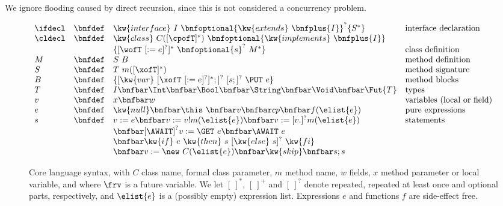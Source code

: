 \documentclass[12pt]{article}%
\begin{document}
We ignore flooding caused by direct recursion,
since this is not considered a concurrency problem.

\begin{figure}[t!]
$$
%
  \begin{array}{lrl@{\hspace{1em}}l} 
    \ifdecl & \bnfdef & 
    \kw{interface}\ I\ \bnfoptional{\kw{extends}\ \bnfplus{I}}^? 
    \{S^*\} 
    & 
    \text{interface declaration} 
    \\ 
    \cldecl & \bnfdef & \kw{class}\ C([\cpofT]^*
    )\
    \bnfoptional{\kw{implements}\ \bnfplus{I}}\ \\ & & 
  \{[\wofT  \ [:=e]^?]^*
    \
    \bnfoptional{
    s
    }^?\
    M^*
\}&   \text{class definition} 
    \\  
    M & \bnfdef & 
    S\ B
	& \text{method definition} 
    \\
    S & \bnfdef & T\ m ([\xofT]^*
    )&  \text{method signature} 
    \\ 
    B & \bnfdef & \{[\kw{var}\ [\xofT \ [:=e]^?]^*;]^?%
    \ [s;]^?\ \PUT \ e\} & \text{method blocks} \\    
    T & \bnfdef & I %
 \bnfbar \Int \bnfbar \Bool \bnfbar \String \bnfbar \Void \bnfbar \Fut{T}
    &  \text{types} \\
    v & \bnfdef & x \bnfbar w 
    & \text{variables (local or field)} 
    \\ 
    e & \bnfdef &  \kw{null} \bnfbar \this\ 
    \bnfbar v  \bnfbar cp  \bnfbar f(\elist{e}) &
    \text{pure expressions} 
    \\ 
    s & \bnfdef  & 
     v := e \bnfbar 
     v := v!m(\elist{e})  \bnfbar 
     v := [v.]^? m(\elist{e})         & \text{statements} 
 \\ &&  
    \bnfbar  [\AWAIT]^?   v := \GET \ e  \bnfbar \AWAIT\ e 
 \\ &&
    \bnfbar \kw{if}\ e\ \kw{then} \ s\ [\kw{else}\ s]^? \ \kw{fi} 
    \\ &&
    \bnfbar v := \new \ C(\elist{e})
    \bnfbar  \kw{skip} \bnfbar s;s  
\\
\end{array}
$$
\caption{\label{fig-creol} Core language syntax, with $C$ class name,
  \cp formal class parameter, $m$ method name, $w$ fields, $x$ method
  parameter or local variable, and where $\frv$ is a future variable.
  We let $[~]^*$, $[~]^+$ and $[~]^?$ denote repeated, repeated at least
  once and optional parts, 
  respectively, and $\elist{e}$ is a (possibly empty) expression list.
  Expressions $e$ and functions $f$ are side-effect free.}
\end{figure}
\end{document}
